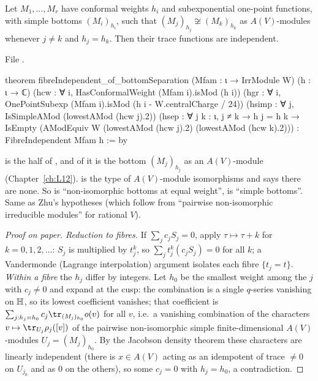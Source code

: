 \begin{theorem}\label{l15:thm:indep}
Let $M_1,\dots,M_r$ have conformal weights $h_i$ and subexponential one-point functions, with simple bottoms
$(M_i)_{h_i}$, such that $(M_j)_{h_j}\not\cong(M_k)_{h_k}$ as $A(V)$-modules whenever $j\neq k$ and $h_j=h_k$. Then their trace
functions are independent.
\end{theorem}
\noindent File .
\begin{leancode}
theorem fibreIndependent_of_bottomSeparation (Mfam : ι → IrrModule W) (h : ι → ℂ)
    (hcw : ∀ i, HasConformalWeight (Mfam i).isMod (h i))
    (hgr : ∀ i, OnePointSubexp (Mfam i).isMod (h i - W.centralCharge / 24))
    (hsimp : ∀ j, IsSimpleAMod (lowestAMod (hcw j).2))
    (hsep : ∀ j k : ι, j ≠ k → h j = h k →
      IsEmpty (AModEquiv W (lowestAMod (hcw j).2) (lowestAMod (hcw k).2))) :
    FibreIndependent Mfam h := by
\end{leancode}

\begin{dictionary}
 is the  half of , and  of it is the bottom
$(M_j)_{h_j}$ as an $A(V)$-module (Chapter~\ref{ch:L12}).  is the type of $A(V)$-module isomorphisms
and  says there are none. So  is ``non-isomorphic bottoms at equal weight'',  is
``simple bottoms''. Same as Zhu's hypotheses (which follow from ``pairwise non-isomorphic irreducible modules'' for rational
$V$).
\end{dictionary}

\begin{proof}[Proof on paper]
\emph{Reduction to fibres.} If $\sum_jc_jS_j=0$, apply $\tau\mapsto\tau+k$ for $k=0,1,2,\dots$: $S_j$ is multiplied by
$t_j^k$, so $\sum_jt_j^k(c_jS_j)=0$ for all $k$; a Vandermonde (Lagrange interpolation) argument isolates each
fibre $\{t_j=t\}$. \emph{Within a fibre} the $h_j$ differ by integers. Let $h_0$ be the smallest weight among the $j$
with $c_j\neq0$ and expand at the cusp: the combination is a single $q$-series vanishing on $\mathbb{H}$, so its lowest
coefficient vanishes; that coefficient is $\sum_{j:h_j=h_0}c_j\tr_{(M_j)_{h_0}}o(v)$ for all $v$, i.e.\ a vanishing combination
of the characters $v\mapsto\tr_{U_j}\rho_j([v])$ of the pairwise non-isomorphic simple finite-dimensional $A(V)$-modules
$U_j=(M_j)_{h_0}$. By the Jacobson density theorem these characters are linearly independent (there is $x\in A(V)$ acting as
an idempotent of trace $\ne0$ on $U_{j_0}$ and as $0$ on the others), so some $c_j=0$ with $h_j=h_0$, a contradiction.
\end{proof}

